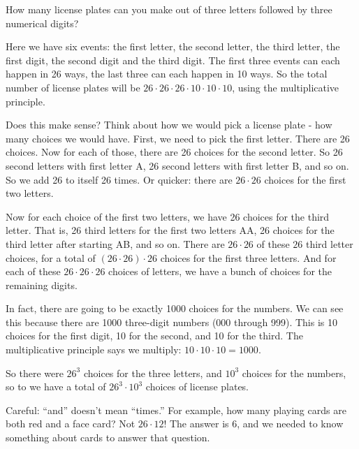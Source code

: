\documentclass[12pt]{article}
\begin{document}
\begin{example}
  How many license plates can you make out of three letters followed by three numerical digits?
  
  \begin{solution}
    Here we have six events: the first letter, the second letter, the third letter, the first digit, the second digit and the third digit.  The first three events can each happen in 26 ways, the last three can each happen in 10 ways.  So the total number of license plates will be $26\cdot 26\cdot 26 \cdot 10 \cdot 10 \cdot 10$, using the multiplicative principle.
    
    Does this make sense?  Think about how we would pick a license plate - how many choices we would have.  First, we need to pick the first letter.  There are 26 choices.  Now for each of those, there are 26 choices for the second letter.  So 26 second letters with first letter A, 26 second letters with first letter B, and so on.  So we add 26 to itself 26 times.  Or quicker: there are $26 \cdot 26$ choices for the first two letters.  
    
    Now for each choice of the first two letters, we have 26 choices for the third letter.  That is, 26 third letters for the first two letters AA, 26 choices for the third letter after starting AB, and so on.  There are $26 \cdot 26$ of these $26$ third letter choices, for a total of $(26\cdot26)\cdot 26$ choices for the first three letters.  And for each of these $26\cdot26\cdot26$ choices of letters, we have a bunch of choices for the remaining digits.
    
    In fact, there are going to be exactly 1000 choices for the numbers.  We can see this because there are 1000 three-digit numbers (000 through 999).  This is 10 choices for the first digit, 10 for the second, and 10 for the third.  The multiplicative principle says we multiply: $10\cdot 10 \cdot 10 = 1000$.  
    
    So there were $26^3$ choices for the three letters, and $10^3$ choices for the numbers, so to we have a total of $26^3 \cdot 10^3$ choices of license plates.
  \end{solution}

\end{example}


 Careful: ``and'' doesn't mean ``times.''  For example, how many playing cards are both red and a face card?  Not $26 \cdot 12$!  The answer is 6, and we needed to know something about cards to answer that question.  
 
\end{document}
